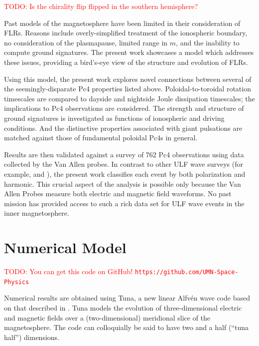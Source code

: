 \documentclass{article}
\newcommand{\todo}[1]{ \textcolor{red}{TODO: #1} }
\newcommand{\Alfven}{Alfv\'en\xspace}
\newcommand{\azm}{\ensuremath{m}\xspace}
\begin{document}
\todo{Is the chirality flip flipped in the southern hemisphere?}

Past models of the magnetosphere have been limited in their consideration of FLRs. Reasons include overly-simplified treatment of the ionospheric boundary, no consideration of the plasmapause, limited range in \azm, and the inability to compute ground signatures. The present work showcases a model which addresses these issues, providing a bird’s-eye view of the structure and evolution of FLRs.

Using this model, the present work explores novel connections between several of the seemingly-disparate Pc4 properties listed above. Poloidal-to-toroidal rotation timescales are compared to dayside and nightside Joule dissipation timescales; the implications to Pc4 observations are considered. The strength and structure of ground signatures is investigated as functions of ionospheric and driving conditions. And the distinctive properties associated with giant pulsations are matched against those of fundamental poloidal Pc4s in general.

Results are then validated against a survey of 762 Pc4 observations using data collected by the Van Allen probes. In contrast to other ULF wave surveys (for example, \cite{dai_2015} and \cite{motoba_2015}), the present work classifies each event by both polarization and harmonic. This crucial aspect of the analysis is possible only because the Van Allen Probes measure both electric and magnetic field waveforms. No past mission has provided access to such a rich data set for ULF wave events in the inner magnetosphere.


\section{Numerical Model}

\todo{You can get this code on GitHub! \texttt{https://github.com/UMN-Space-Physics} }

Numerical results are obtained using Tuna, a new linear \Alfven wave code based on that described in \cite{lysak_2013}. Tuna models the evolution of three-dimensional electric and magnetic fields over a (two-dimensional) meridional slice of the magnetosphere. The code can colloquially be said to have two and a half (``tuna half'') dimensions.
\end{document}
